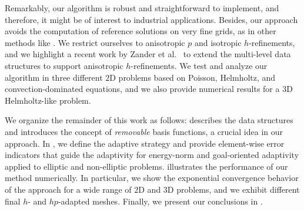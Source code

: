 Remarkably, our algorithm is robust and straightforward to implement, and therefore, it might be of interest to industrial applications. Besides, our approach avoids the computation of reference solutions on very fine grids, as in other methods like \cite{demkowicz2002fully}. We restrict ourselves to anisotropic $p$ and isotropic $h$-refinements, and we highlight a recent work by Zander et al.~\cite{zander2022anisotropic} to extend the multi-level data structures to support anisotropic $h$-refinements. We test and analyze our algorithm in three different $2$D problems based on Poisson, Helmholtz, and convection-dominated equations, and we also provide numerical results for a $3$D Helmholtz-like problem.

We organize the remainder of this work as follows:  describes the data structures and introduces the concept of \emph{removable} basis functions, a crucial idea in our approach. In , we define the adaptive strategy and provide element-wise error indicators that guide the adaptivity for energy-norm and goal-oriented adaptivity applied to elliptic and non-elliptic problems.  illustrates the performance of our method numerically. In particular, we show the exponential convergence behavior of the approach for a wide range of $2$D and $3$D problems, and we exhibit different final $h$- and $hp$-adapted meshes. Finally, we present our conclusions in .

%
